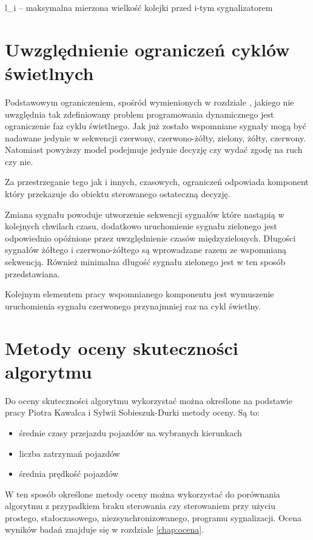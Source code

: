 l_{i} \textrm{ -- maksymalna mierzona wielkość kolejki przed i-tym sygnalizatorem}

\section{Uwzględnienie ograniczeń cyklów świetlnych}
Podstawowym ograniczeniem, spośród wymienionych w rozdziale \label{sec:model_ograniczenia}, jakiego nie uwzględnia tak zdefiniowany problem programowania dynamicznego jest ograniczenie faz cyklu świetlnego. Jak już zostało wspomniane sygnały mogą być nadawane jedynie w sekwencji czerwony, czerwono-żółty, zielony, żółty, czerwony. Natomiast powyższy model podejmuje jedynie decyzję czy wydać zgodę na ruch czy nie.

Za przestrzeganie tego jak i innych, czasowych, ograniczeń odpowiada komponent który przekazuje do obiektu sterowanego ostateczną decyzję.

Zmiana sygnału powoduje utworzenie sekwencji sygnałów które nastąpią w kolejnych chwilach czasu, dodatkowo uruchomienie sygnału zielonego jest odpowiednio opóźnione przez uwzględnienie czasów międzyzielonych. Długości sygnałów żółtego i czerwono-żółtego są wprowadzane razem ze wspomnianą sekwencją. Również minimalna długość sygnału zielonego jest w ten sposób przedstawiana.

Kolejnym elementem pracy wspomnianego komponentu jest wymuszenie uruchomienia sygnału czerwonego przynajmniej raz na cykl świetlny.

\section{Metody oceny skuteczności algorytmu}
Do oceny skuteczności algorytmu wykorzystać można określone na podstawie pracy Piotra Kawalca i Sylwii Sobieszuk-Durki \cite{kawalec+sobieszuk-durka} metody oceny. Są to:
\begin{itemize}
	\item średnie czasy przejazdu pojazdów na wybranych kierunkach
	\item liczba zatrzymań pojazdów
	\item średnia prędkość pojazdów
\end{itemize}

W ten sposób określone metody oceny można wykorzystać do porównania algorytmu z przypadkiem braku sterowania czy sterowaniem przy użyciu prostego, stałoczasowego, niezsynchronizowanego, programu sygnalizacji. Ocena wyników badań znajduje się w rozdziale \ref{chap:ocena}.